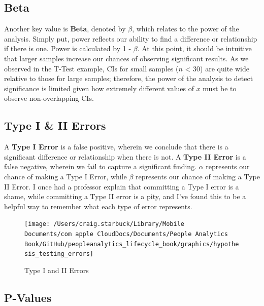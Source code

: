 \documentclass[]{book}
\begin{document}
\hypertarget{beta}{%
\subsection{Beta}\label{beta}}

Another key value is \textbf{Beta}, denoted by \(\beta\), which relates to the power of the analysis. Simply put, power reflects our ability to find a difference or relationship if there is one. Power is calculated by 1 - \(\beta\). At this point, it should be intuitive that larger samples increase our chances of observing significant results. As we observed in the T-Test example, CIs for small samples (\(n\) \textless{} 30) are quite wide relative to those for large samples; therefore, the power of the analysis to detect significance is limited given how extremely different values of \(x\) must be to observe non-overlapping CIs.

\hypertarget{type-i-ii-errors}{%
\subsection{Type I \& II Errors}\label{type-i-ii-errors}}

A \textbf{Type I Error} is a false positive, wherein we conclude that there is a significant difference or relationship when there is not. A \textbf{Type II Error} is a false negative, wherein we fail to capture a significant finding. \(\alpha\) represents our chance of making a Type I Error, while \(\beta\) represents our chance of making a Type II Error. I once had a professor explain that committing a Type I error is a shame, while committing a Type II error is a pity, and I've found this to be a helpful way to remember what each type of error represents.

\begin{figure}

{\centering \texttt{[image: /Users/craig.starbuck/Library/Mobile Documents/com~apple~CloudDocs/Documents/People Analytics Book/GitHub/peopleanalytics\_lifecycle\_book/graphics/hypothesis\_testing\_errors]} 

}

\caption{Type I and II Errors}\label{fig:hyp-errs}
\end{figure}

\hypertarget{p-values}{%
\subsection{P-Values}\label{p-values}}
\end{document}
